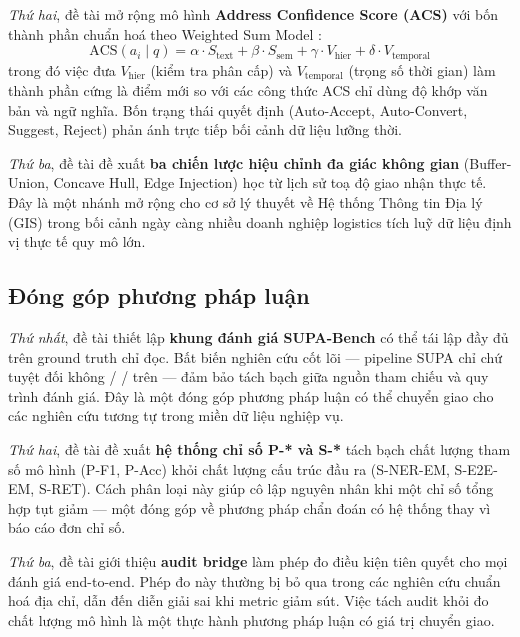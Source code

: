 \emph{Thứ hai}, đề tài mở rộng mô hình \textbf{Address Confidence Score (ACS)} với bốn thành phần chuẩn hoá theo Weighted Sum Model \cite{hwang1981, saaty1980, zavadskas2019multiple}:
\begin{equation*}
\mathrm{ACS}(a_i \mid q) = \alpha \cdot S_{\text{text}} + \beta \cdot S_{\text{sem}} + \gamma \cdot V_{\text{hier}} + \delta \cdot V_{\text{temporal}}
\end{equation*}
trong đó việc đưa \(V_{\text{hier}}\) (kiểm tra phân cấp) và \(V_{\text{temporal}}\) (trọng số thời gian) làm thành phần cứng là điểm mới so với các công thức ACS chỉ dùng độ khớp văn bản và ngữ nghĩa. Bốn trạng thái quyết định (Auto-Accept, Auto-Convert, Suggest, Reject) phản ánh trực tiếp bối cảnh dữ liệu lưỡng thời.

\emph{Thứ ba}, đề tài đề xuất \textbf{ba chiến lược hiệu chỉnh đa giác không gian} (Buffer-Union, Concave Hull, Edge Injection) học từ lịch sử toạ độ giao nhận thực tế. Đây là một nhánh mở rộng cho cơ sở lý thuyết về Hệ thống Thông tin Địa lý (GIS) trong bối cảnh ngày càng nhiều doanh nghiệp logistics tích luỹ dữ liệu định vị thực tế quy mô lớn.

\subsection{Đóng góp phương pháp luận}
\label{sec:concl-methodological}

\emph{Thứ nhất}, đề tài thiết lập \textbf{khung đánh giá SUPA-Bench} có thể tái lập đầy đủ trên ground truth chỉ đọc. Bất biến nghiên cứu cốt lõi --- pipeline SUPA chỉ  chứ tuyệt đối không  /  /  trên  --- đảm bảo tách bạch giữa nguồn tham chiếu và quy trình đánh giá. Đây là một đóng góp phương pháp luận có thể chuyển giao cho các nghiên cứu tương tự trong miền dữ liệu nghiệp vụ.

\emph{Thứ hai}, đề tài đề xuất \textbf{hệ thống chỉ số P-* và S-*} tách bạch chất lượng tham số mô hình (P-F1, P-Acc) khỏi chất lượng cấu trúc đầu ra (S-NER-EM, S-E2E-EM, S-RET). Cách phân loại này giúp cô lập nguyên nhân khi một chỉ số tổng hợp tụt giảm --- một đóng góp về phương pháp chẩn đoán có hệ thống thay vì báo cáo đơn chỉ số.

\emph{Thứ ba}, đề tài giới thiệu \textbf{audit bridge} làm phép đo điều kiện tiên quyết cho mọi đánh giá end-to-end. Phép đo này thường bị bỏ qua trong các nghiên cứu chuẩn hoá địa chỉ, dẫn đến diễn giải sai khi metric giảm sút. Việc tách audit khỏi đo chất lượng mô hình là một thực hành phương pháp luận có giá trị chuyển giao.

